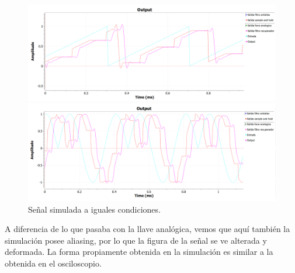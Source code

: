 \documentclass[../../ASSD_TP1_G7.tex]{subfiles}
\begin{document}
\begin{figure}[H]

\begin{centering}
\includegraphics[scale=0.5]{Imagenes/simulacion_syh_diente_d.PNG}
\par\end{centering}
\begin{centering}
\includegraphics[scale=0.5]{Imagenes/simulacion_syh_senoraro_d.PNG}\caption{Señal simulada a iguales condiciones.}
\par\end{centering}
\end{figure}

A diferencia de lo que pasaba con la llave analógica, vemos que aquí
también la simulación posee aliasing, por lo que la figura de la señal
se ve alterada y deformada. La forma propiamente obtenida en la simulación
es similar a la obtenida en el osciloscopio.
\end{document}
